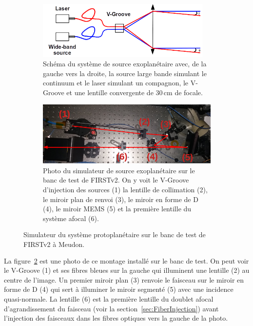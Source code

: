 \begin{figure}[ht!]
    \centering
    \begin{subfigure}{\textwidth}
        \centering
        \includegraphics[width=0.95\textwidth]{Figure_Chap4/BinarySystemScheme_02.png}
        \caption{Schéma du système de source exoplanétaire avec, de la gauche vers la droite, la source large bande simulant le continuum et le laser simulant un compagnon, le V-Groove et une lentille convergente de $30 \,$cm de focale.}
        \label{fig:BinarySystA}
    \end{subfigure}
    \begin{subfigure}[t]{0.95\textwidth}
        \centering
        \includegraphics[width=\textwidth]{Figure_Chap4/20210531_BinarySetup_Crop_Annotation.png}
        \caption{Photo du simulateur de source exoplanétaire sur le banc de test de FIRSTv2. On y voit le V-Groove d'injection des sources (1) la lentille de collimation (2), le miroir plan de renvoi (3), le miroir en forme de D (4), le miroir MEMS (5) et la première lentille du système afocal (6).}
        \label{fig:BinarySystB}
    \end{subfigure}
    \caption[Simulateur du système protoplanétaire sur le banc de test de FIRSTv2 à Meudon.]{Simulateur du système protoplanétaire sur le banc de test de FIRSTv2 à Meudon.}
    \label{fig:BinarySyst}
\end{figure}

La figure~\ref{fig:BinarySystB} est une photo de ce montage installé sur le banc de test. On peut voir le V-Groove (1) et ses fibres bleues sur la gauche qui illuminent une lentille (2) au centre de l'image. Un premier miroir plan (3) renvoie le faisceau sur le miroir en forme de D (4) qui sert à illuminer le miroir segmenté (5) avec une incidence quasi-normale. La lentille (6) est la première lentille du doublet afocal d'agrandissement du faisceau (voir la section~\ref{sec:FiberInjection}) avant l'injection des faisceaux dans les fibres optiques vers la gauche de la photo.

